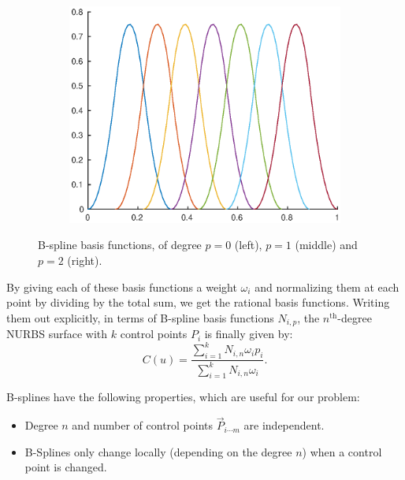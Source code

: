 \begin{figure}
\begin{subfigure}[b]{.3\linewidth}
  \includegraphics[width=\linewidth]{Pictures/basisquadratic}
  \label{fig:lognorm_quadratic}
\end{subfigure}
\caption{B-spline basis functions, of degree $p=0$ (left), $p=1$ (middle) and $p=2$ (right).}
\label{fig:bsplineBases}
\end{figure}


By giving each of these basis functions a weight $\omega_i$ and normalizing them at each point by dividing by the total sum, we get the rational basis functions. Writing them out explicitly, in terms of B-spline basis functions $N_{i,p}$, the $n^{\text{th}}$-degree NURBS surface with $k$ control points $P_i$ is finally given by:
\begin{equation}
C(u) = \frac{\sum_{i=1}^{k}N_{i,n}\omega_{i}p_{i}}{\sum_{i=1}^{k}N_{i,n}\omega_{i}}.
\end{equation}

B-splines have the following properties, which are useful for our problem:
\begin{itemize}
\item Degree $n$ and number of control points $\vec{P}_{i\cdots m}$ are independent.
\item B-Splines only change locally (depending on the degree $n$) when a control point is changed.
\end{itemize}

